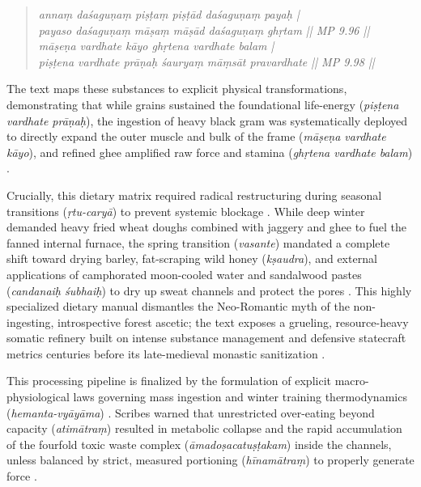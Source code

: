 \documentclass[11pt,twoside,letterpaper]{article}
\begin{document}
\begin{quote}
\small
\textit{anna\d{m} da\'sagu\d{n}a\d{m} pi\d{s}\d{t}a\d{m} pi\d{s}\d{t}\={a}d da\'sagu\d{n}a\d{m} paya\d{h} | \\
payaso da\'sagu\d{n}a\d{m} m\={a}\d{s}a\d{m} m\={a}\d{s}\={a}d da\'sagu\d{n}a\d{m} gh\d{r}tam || MP 9.96 || \\
m\={a}\d{s}e\d{n}a vardhate k\={a}yo gh\d{r}tena vardhate balam | \\
pi\d{s}\d{t}ena vardhate pr\={a}\d{n}a\d{h} \'saurya\d{m} m\={a}\d{m}s\={a}t pravardhate || MP 9.98 ||}
\end{quote}

The text maps these substances to explicit physical transformations, demonstrating that while grains sustained the foundational life-energy (\textit{pi\d{s}\d{t}ena vardhate pr\={a}\d{n}a\d{h}}), the ingestion of heavy black gram was systematically deployed to directly expand the outer muscle and bulk of the frame (\textit{m\={a}\d{s}e\d{n}a vardhate k\={a}yo}), and refined ghee amplified raw force and stamina (\textit{gh\d{r}tena vardhate balam}) \citep{MP_7_v20}. 

Crucially, this dietary matrix required radical restructuring during seasonal transitions (\textit{\d{r}tu-cary\={a}}) to prevent systemic blockage \citep{MP_7_v21}. While deep winter demanded heavy fried wheat doughs combined with jaggery and ghee to fuel the fanned internal furnace, the spring transition (\textit{vasante}) mandated a complete shift toward drying barley, fat-scraping wild honey (\textit{k\d{s}audra}), and external applications of camphorated moon-cooled water and sandalwood pastes (\textit{candanai\d{h} \'subhai\d{h}}) to dry up sweat channels and protect the pores \citep{MP_7_v22}. This highly specialized dietary manual dismantles the Neo-Romantic myth of the non-ingesting, introspective forest ascetic; the text exposes a grueling, resource-heavy somatic refinery built on intense substance management and defensive statecraft metrics centuries before its late-medieval monastic sanitization \citep{MP_7_v23, Wujastyk2025}.

This processing pipeline is finalized by the formulation of explicit macro-physiological laws governing mass ingestion and winter training thermodynamics (\textit{hemanta-vy\={a}y\={a}ma}) \citep{MP_7_v24}. Scribes warned that unrestricted over-eating beyond capacity (\textit{atim\={a}tra\d{m}}) resulted in metabolic collapse and the rapid accumulation of the fourfold toxic waste complex (\textit{\={a}mado\d{s}acatu\d{s}\d{t}akam}) inside the channels, unless balanced by strict, measured portioning (\textit{h\={i}nam\={a}tra\d{m}}) to properly generate force \citep{MP_7_v25}. 
\end{document}
